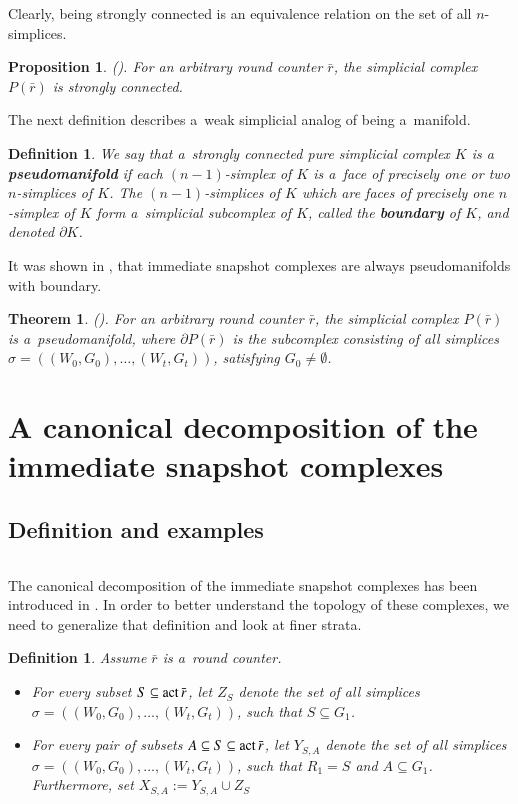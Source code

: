 \documentclass{amsart}[10pt]
\newtheorem{df}[theorem]{Definition}
\newtheorem{thm}[theorem]{Theorem} \newtheorem{lemma}[theorem]{Lemma}
\newtheorem{prop}[theorem]{Proposition}
\newcommand{\act}{\text{\rm act}\,}
\newcommand{\es}{\emptyset}
\newcommand{\tr}{{\bar r}}
\newcommand{\ab}{\allowbreak}
\numberwithin{equation}{section}
\numberwithin{figure}{section}
\numberwithin{table}{section}
\begin{document}
Clearly, being strongly connected is an equivalence relation on the
set of all $n$-simplices.

\begin{prop}\label{prop:strc} {\rm (\cite[Proposition 5.6]{k1}).}
For an arbitrary round counter $\tr$, the simplicial complex $P(\tr)$
is strongly connected.
\end{prop}

The next definition describes a~weak simplicial analog of being
a~manifold.

\begin{df}
We say that a~strongly connected pure simplicial complex $K$ is a~{\bf
  pseudomanifold} if each $(n-1)$-simplex of $K$ is a~face of
precisely one or two $n$-simplices of $K$. The $(n-1)$-simplices of
$K$ which are faces of precisely one $n$-simplex of $K$ form
a~simplicial subcomplex of $K$, called the {\bf boundary} of $K$, and
denoted $\partial K$.
\end{df}

It was shown in \cite{k1}, that immediate snapshot complexes are
always pseudomanifolds with boundary.

\begin{thm}\label{prop:pseudo} {\rm (\cite[Proposition 5.9]{k1}).}
For an arbitrary round counter $\tr$, the simplicial complex $P(\tr)$
is a~pseudomanifold, where $\partial P(\tr)$ is the subcomplex
consisting of all simplices $\sigma=((W_0,G_0),\ab\dots,(W_t,G_t))$,
satisfying $G_0\neq\es$.
\end{thm}

\section{A canonical decomposition of the immediate snapshot complexes}

\subsection{Definition and examples}
$\,$

\nin The canonical decomposition of the immediate snapshot complexes has
been introduced in \cite{k1}. In order to better understand the
topology of these complexes, we need to generalize that definition and
look at finer strata.

\begin{df}
Assume $\tr$ is a~round counter.
\begin{itemize}
\item For every subset $S\subseteq\act\tr$, let $Z_S$ denote the set
  of all simplices $\sigma=((W_0,G_0),\ab\dots,\ab(W_t,G_t))$, such
  that $S\subseteq G_1$.
\item For every pair of subsets $A\subseteq S\subseteq\act\tr$, let
  $Y_{S,A}$ denote the set of all simplices
  $\sigma=((W_0,G_0),\dots,(W_t,G_t))$, such that $R_1=S$ and
  $A\subseteq G_1$. Furthermore, set $X_{S,A}:=Y_{S,A}\cup Z_S$
\end{itemize} 
\end{df}
\end{document}
